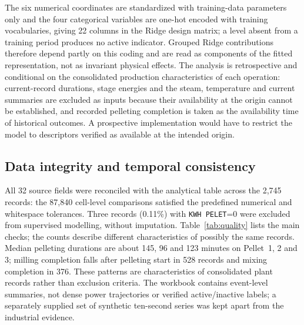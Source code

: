 The six numerical coordinates are standardized with training-data parameters only and the four categorical variables are one-hot encoded with training vocabularies, giving 22 columns in the Ridge design matrix; a level absent from a training period produces no active indicator. Grouped Ridge contributions therefore depend partly on this coding and are read as components of the fitted representation, not as invariant physical effects. The analysis is retrospective and conditional on the consolidated production characteristics of each operation: current-record durations, stage energies and the steam, temperature and current summaries are excluded as inputs because their availability at the origin cannot be established, and recorded pelleting completion is taken as the availability time of historical outcomes. A prospective implementation would have to restrict the model to descriptors verified as available at the intended origin.

\subsection{Data integrity and temporal consistency}
All 32 source fields were reconciled with the analytical table across the 2,745 records: the 87,840 cell-level comparisons satisfied the predefined numerical and whitespace tolerances. Three records (0.11\%) with \texttt{KWH PELET}=0 were excluded from supervised modelling, without imputation. Table~\ref{tab:quality} lists the main checks; the counts describe different characteristics of possibly the same records. Median pelleting durations are about 145, 96 and 123 minutes on Pellet~1, 2 and 3; milling completion falls after pelleting start in 528 records and mixing completion in 376. These patterns are characteristics of consolidated plant records rather than exclusion criteria. The workbook contains event-level summaries, not dense power trajectories or verified active/inactive labels; a separately supplied set of synthetic ten-second series was kept apart from the industrial evidence.


